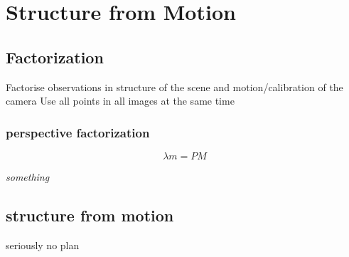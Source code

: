 \section{Structure from Motion}
\subsection{Factorization}
Factorise observations in structure of the scene and motion/calibration of the camera
Use all points in all images at the same time

\subsubsection{perspective factorization}
$$\lambda m = P M $$

\textit{something}

\subsection{structure from motion}

seriously no plan